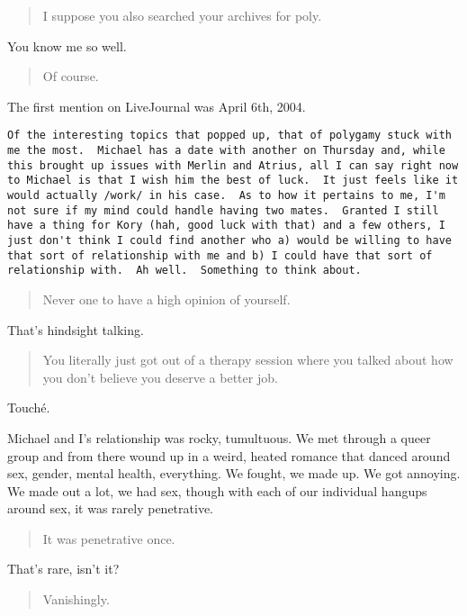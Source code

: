 \begin{quote}
I suppose you also searched your archives for poly.
\end{quote}

You know me so well.

\begin{quote}
Of course.
\end{quote}

The first mention on LiveJournal was April 6th, 2004.

\begin{verbatim}
Of the interesting topics that popped up, that of polygamy stuck with me the most.  Michael has a date with another on Thursday and, while this brought up issues with Merlin and Atrius, all I can say right now to Michael is that I wish him the best of luck.  It just feels like it would actually /work/ in his case.  As to how it pertains to me, I'm not sure if my mind could handle having two mates.  Granted I still have a thing for Kory (hah, good luck with that) and a few others, I just don't think I could find another who a) would be willing to have that sort of relationship with me and b) I could have that sort of relationship with.  Ah well.  Something to think about.
\end{verbatim}

\begin{quote}
Never one to have a high opinion of yourself.
\end{quote}

That's hindsight talking.

\begin{quote}
You literally just got out of a therapy session where you talked about how you don't believe you deserve a better job.
\end{quote}

Touché.

Michael and I's relationship was rocky, tumultuous. We met through a queer group and from there wound up in a weird, heated romance that danced around sex, gender, mental health, everything. We fought, we made up. We got annoying. We made out a lot, we had sex, though with each of our individual hangups around sex, it was rarely penetrative.

\begin{quote}
It was penetrative once.
\end{quote}

That's rare, isn't it?

\begin{quote}
Vanishingly.
\end{quote}

